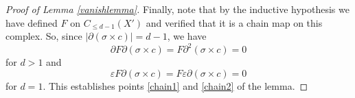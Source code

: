 \documentclass[11pt,letterpaper]{amsart}
\newtheorem*{remark}{Remark}
\begin{document}
\begin{proof}[Proof of Lemma \ref{vanishlemma}]
Finally, note that by the inductive hypothesis we have defined $F$ on $C_{\leq d-1}(X')$ and verified that it is a chain map on this complex. So, since $|\partial(\sigma\times c)|=d-1$, we have 
$$
\partial F\partial(\sigma\times c)=F\partial^2(\sigma\times c)=0
$$
for $d>1$ and 
$$
\varepsilon F\partial(\sigma\times c)=F\varepsilon\partial(\sigma\times c)=0
$$
for $d=1$. This establishes points \ref{chain1} and \ref{chain2} of the lemma.%



\end{proof}
\end{document}
